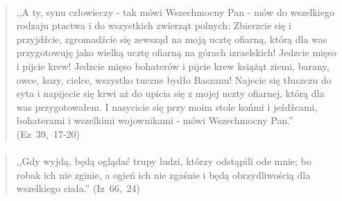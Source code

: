 \documentclass[10pt,a4paper,oneside]{article}
\begin{document}
\paragraph{}
\begin{quote}
,,A ty, synu człowieczy - tak mówi Wszechmocny Pan - mów do wszelkiego rodzaju ptactwa i do wszystkich zwierząt polnych: Zbierzcie się i przyjdźcie, zgromadźcie się zewsząd na moją ucztę ofiarną, którą dla was przygotowuję jako wielką ucztę ofiarną na górach izraelskich! Jedzcie mięso i pijcie krew! Jedzcie mięso bohaterów i pijcie krew książąt ziemi, barany, owce, kozy, cielce, wszystko tuczne bydło Baszanu! Najecie się tłuszczu do syta i napijecie się krwi aż do upicia się z mojej uczty ofiarnej, którą dla was przygotowałem. I nasycicie się przy moim stole końmi i jeźdźcami, bohaterami i wszelkimi wojownikami - mówi Wszechmocny Pan.'' \mbox{(Ez 39, 17-20)}
\end{quote}
\paragraph{}
\begin{quote}
,,Gdy wyjdą, będą oglądać trupy ludzi, którzy odstąpili ode mnie; bo robak ich nie zginie, a ogień ich nie zgaśnie i będą obrzydliwością dla wszelkiego ciała.'' \mbox{(Iz 66, 24)}
\end{quote}
\end{document}
